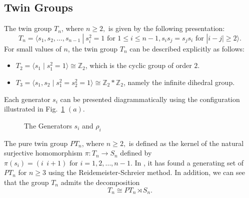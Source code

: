 \documentclass[preprint]{elsarticle}
\begin{document}
\subsection{Twin Groups}
The twin group $T_n$, where $n\geq 2,$ is given by the following presentation:
\[
T_n = \langle s_1,s_2,\dots, s_{n-1} ~|~ s_i^2 =1 \text{ for }  1\leq i \leq n-1, s_is_j = s_js_i \text{ for } |i-j|\geq2 \rangle.
\]
\noindent For small values of \(n\), the twin group \(T_n\) can be described explicitly as follows:
\begin{itemize}
\item \(T_2=\langle s_1 \mid s_1^2=1 \rangle \cong \mathbb{Z}_2\), which is the cyclic group of order \(2\).
\item \(T_3=\langle s_1,s_2 \mid s_1^2=s_2^2=1 \rangle \cong \mathbb{Z}_2 * \mathbb{Z}_2\), namely the infinite dihedral group.
\end{itemize}
Each generator $s_i$ can be presented diagrammatically using the configuration illustrated in Fig.~\ref{fig:generator} $(a)$.

\begin{figure}
    \centering
    \caption{The Generators $s_i$ and $\rho_i$}
    \label{fig:generator}
\end{figure}
The pure twin group $PT_n$, where $n\geq 2,$ is defined as the kernel of the natural surjective homomorphism $ \pi: T_n \longrightarrow S_n$ defined by $ \pi(s_i) = (i\ \ i+1) \text{ for } i=1,2,\dots, n-1.$ In \cite{BSV}, it has found a generating set of $PT_n$ for $n\geq 3$ using the Reidemeister-Schreier
 method. In addition, we can see that the group $T_n$ admits the decomposition 
\[
T_n \cong PT_n \rtimes S_n.
\]
\end{document}
